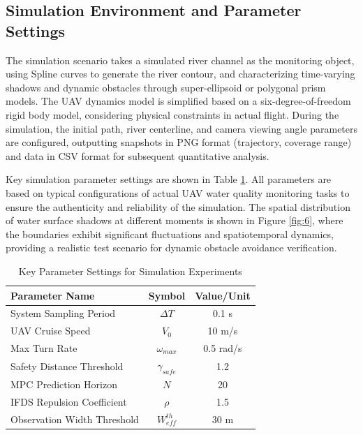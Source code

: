 \documentclass[final,3p,times,numbers]{elsarticle}
\begin{document}
\subsection{Simulation Environment and Parameter Settings}
The simulation scenario takes a simulated river channel as the monitoring object, using Spline curves to generate the river contour, and characterizing time-varying shadows and dynamic obstacles through super-ellipsoid or polygonal prism models. The UAV dynamics model is simplified based on a six-degree-of-freedom rigid body model, considering physical constraints in actual flight. During the simulation, the initial path, river centerline, and camera viewing angle parameters are configured, outputting snapshots in PNG format (trajectory, coverage range) and data in CSV format for subsequent quantitative analysis.

Key simulation parameter settings are shown in Table \ref{tab:1}. All parameters are based on typical configurations of actual UAV water quality monitoring tasks to ensure the authenticity and reliability of the simulation. The spatial distribution of water surface shadows at different moments is shown in Figure \ref{fig:6}, where the boundaries exhibit significant fluctuations and spatiotemporal dynamics, providing a realistic test scenario for dynamic obstacle avoidance verification.

\begin{table}[htbp]
    \centering
    \caption{Key Parameter Settings for Simulation Experiments}
    \label{tab:1}
    \begin{tabular}{lcc}
        \hline
        \textbf{Parameter Name} & \textbf{Symbol} & \textbf{Value/Unit} \\
        \hline
        System Sampling Period & $\Delta T$ & 0.1 s \\
        UAV Cruise Speed & $V_0$ & 10 m/s \\
        Max Turn Rate & $\omega_{max}$ & 0.5 rad/s \\
        Safety Distance Threshold & $\gamma_{safe}$ & 1.2 \\
        MPC Prediction Horizon & $N$ & 20 \\
        IFDS Repulsion Coefficient & $\rho$ & 1.5 \\
        Observation Width Threshold & $W_{eff}^{th}$ & 30 m \\
        \hline
    \end{tabular}
\end{table}
\end{document}

